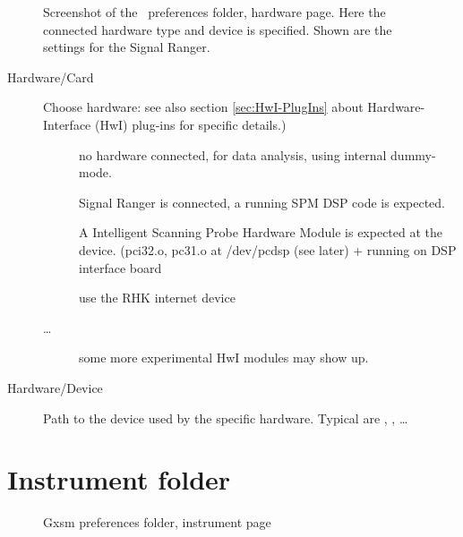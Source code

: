 \begin{figure}[hbt]
\caption{Screenshot of the \Gxsm\ preferences folder, hardware page.
Here the connected hardware type and device is specified. Shown are the settings for the Signal Ranger.}
\label{fig:config:hardware}
\end{figure}

\begin{description}
\item[Hardware/Card] Choose hardware: see also section \ref{sec:HwI-PlugIns} about Hardware-Interface (HwI) plug-ins for specific details.)
  \begin{description}
  \item[] no hardware connected, for data analysis, using internal dummy-mode.
  \item[] Signal Ranger is connected, a running SPM DSP code is expected.
  \item[] A Intelligent Scanning Probe Hardware Module is expected at the device.
	  (pci32.o, pc31.o at /dev/pcdsp (see later) + running  on DSP interface board
  \item[] use the RHK internet device
  \item[\dots] some more experimental HwI modules may show up.
  \end{description}
\item[Hardware/Device] Path to the device used by the specific hardware. Typical are , , \dots
\end{description}

\clearpage
\section{Instrument folder}
\label{sec:conf:instr}

\begin{figure}[hbt]
\center {}
\caption{Gxsm preferences folder, instrument page}
\label{fig:config:instrument}
\end{figure}

